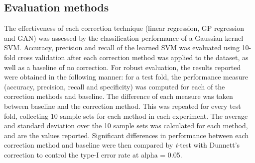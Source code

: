 \subsection{Evaluation methods} \label{evaluation_methods}
%
The effectiveness of each correction technique  (linear regression, GP regression and GAN) was assessed by the classification performance of a Gaussian kernel SVM. Accuracy, precision and recall of the learned SVM was evaluated using 10-fold cross validation after each correction method was applied to the dataset, as well as a baseline of no correction. For robust evaluation, the results reported were obtained in the following manner: for a test fold, the performance measure (accuracy, precision, recall and specificity) was computed for each of the correction methods and baseline.  The difference of each measure was taken between baseline and the correction method. This was repeated for every test fold, collecting 10 sample sets for each method in each experiment. The average and standard deviation over the 10 sample sets was calculated for each method, and are the values reported. Significant differences in performance between each correction method and baseline were then compared by \textit{t}-test with Dunnett's correction to control the type-I error rate at alpha = 0.05.



